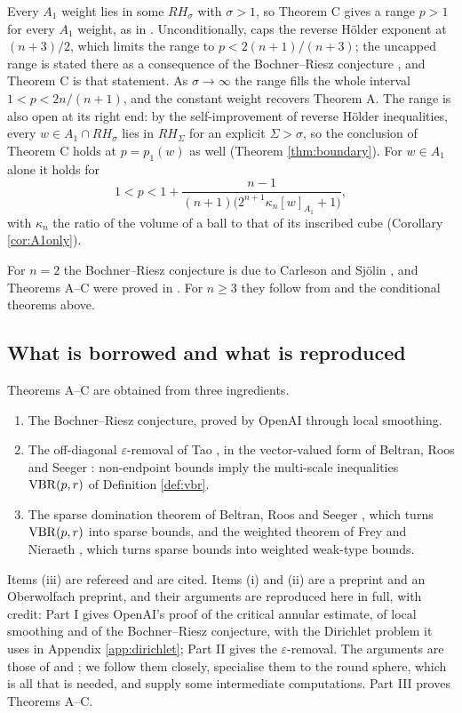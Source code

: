 Every $A_1$ weight lies in some $RH_\sigma$ with $\sigma>1$, so Theorem C gives a range
$p>1$ for every $A_1$ weight, as in \cite[Theorem 1.1]{BRS25}. Unconditionally, \cite[\S9]{BRS25}
caps the reverse H\"older exponent at $(n+3)/2$, which limits the range to $p<2(n+1)/(n+3)$; the
uncapped range is stated there as a consequence of the Bochner--Riesz conjecture
\cite[\S1.1]{BRS25}, and Theorem C is that statement. As $\sigma\to\infty$ the range fills the
whole interval $1<p<2n/(n+1)$, and the constant weight recovers Theorem A. The range is also
open at its right end: by the self-improvement of reverse H\"older inequalities, every
$w\in A_1\cap RH_\sigma$ lies in $RH_\Sigma$ for an explicit $\Sigma>\sigma$, so the conclusion of
Theorem C holds at $p=p_1(w)$ as well (Theorem \ref{thm:boundary}). For $w\in A_1$ alone it holds
for
\[
1<p<1+\frac{n-1}{(n+1)\bigl(2^{n+1}\kappa_n[w]_{A_1}+1\bigr)},
\]
with $\kappa_n$ the ratio of the volume of a ball to that of its inscribed cube (Corollary
\ref{cor:A1only}).

For $n=2$ the Bochner--Riesz conjecture is due to Carleson and Sj\"olin \cite{CS72}, and Theorems A--C
were proved in \cite{See96,BRS25}. For $n\ge3$ they follow from \cite{OAI26} and the conditional
theorems above.

\subsection{What is borrowed and what is reproduced}
Theorems A--C are obtained from three ingredients.
\begin{enumerate}[label=(\roman*)]
\item The Bochner--Riesz conjecture, proved by OpenAI \cite{OAI26} through local smoothing.
\item The off-diagonal $\varepsilon$-removal of Tao \cite{Tao98}, in the vector-valued form of
Beltran, Roos and Seeger \cite{BRS23}: non-endpoint bounds imply the multi-scale
inequalities $\mathrm{VBR}(p,r)$ of Definition \ref{def:vbr}.
\item The sparse domination theorem of Beltran, Roos and Seeger \cite[Theorem 2.3]{BRS25}, which
turns $\mathrm{VBR}(p,r)$ into sparse bounds, and the weighted theorem of Frey and Nieraeth
\cite[Theorem 1.4]{FN19}, which turns sparse bounds into weighted weak-type bounds.
\end{enumerate}
Items (iii) are refereed and are cited. Items (i) and (ii) are a preprint and an Oberwolfach
preprint, and their arguments are reproduced here in full, with credit: Part I gives OpenAI's proof of the
critical annular estimate, of local smoothing and of the Bochner--Riesz conjecture, with the
Dirichlet problem it uses in Appendix \ref{app:dirichlet}; Part II gives the
$\varepsilon$-removal. The arguments are those of \cite{OAI26} and \cite{BRS23}; we follow
them closely, specialise them to the round sphere, which is all that is needed, and supply
some intermediate computations. Part III proves Theorems A--C.

